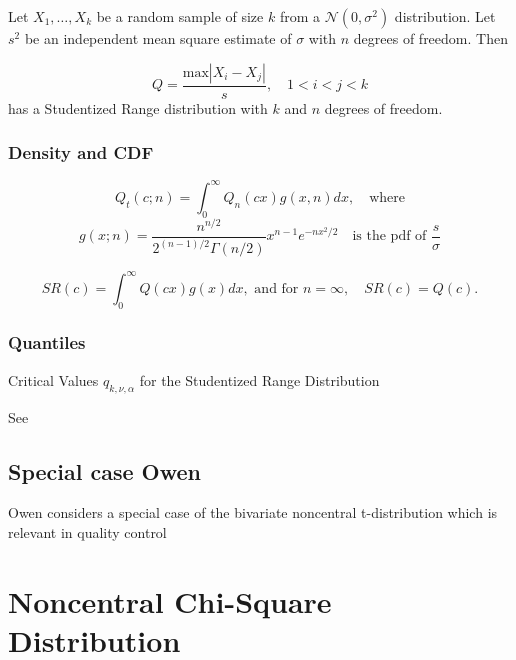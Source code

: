Let $X_1,\ldots,X_k$ be a random sample of size $k$ from a $\mathcal{N}(0,\sigma^2)$ distribution. Let $s^2$ be an independent mean square estimate of $\sigma$ with $n$ degrees of freedom. Then 

\begin{equation}
	Q=\frac{\text{max}|X_i - X_j|}{s}, \quad 1<i<j<k
\end{equation}
has a Studentized Range distribution with $k$ and $n$ degrees of freedom.

\subsubsection{Density and CDF}

\begin{equation}
	Q_t(c; n) =  \int_{0}^\infty Q_n(cx) g(x, n) dx, \quad \text{where}
\end{equation}
\begin{equation}
	g(x; n) =  \frac{n^{n/2}}{2^{(n-1)/2} \Gamma(n/2)}x^{n-1}e^{-nx^2 /2} \quad \text{is the pdf of } \frac{s}{\sigma}
\end{equation}

\begin{equation}
	SR(c) =   \int_{0}^\infty Q(cx) g(x) dx, \text{ and for } n=\infty, \quad SR(c)=Q(c).
\end{equation}


\subsubsection{Quantiles}

Critical  Values $q_{k, \nu, \alpha}$   for  the  Studentized  Range  Distribution 



See \cite{Hirotsu_1979}





\subsection{Special case Owen}
Owen considers a special case of the bivariate noncentral t-distribution which is relevant in quality control \cite{owen_special_1965}



\newpage
\section{Noncentral Chi-Square Distribution}
\label{NoncentralChiSquareDistributionEx}


